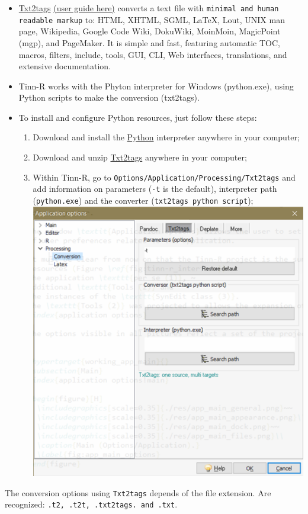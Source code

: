 \begin{itemize}
  \item \href{http://txt2tags.sourceforge.net}{Txt2tags}
    \href{http://txt2tags.sourceforge.net/userguide}{(user guide here)}
    converts a text file with \texttt{minimal and human readable markup} to:
    HTML, XHTML, SGML, \LaTeX, Lout, UNIX man page, Wikipedia, Google Code Wiki,
    DokuWiki, MoinMoin, MagicPoint (mgp), and PageMaker. It is simple and fast,
    featuring automatic TOC, macros, filters, include, tools, GUI, CLI,
    Web interfaces, translations, and extensive documentation.

  \item Tinn-R works with the Phyton interpreter for Windows (python.exe), using
    Python scripts to make the conversion (txt2tags).

  \item To install and configure Python resources, just follow these steps:
    \begin{enumerate}
      \item Download and install the
        \href{http://www.python.org/download/}{Python}
        interpreter anywhere in your computer;
      \item Download and unzip
        \href{http://txt2tags.sourceforge.net/}{Txt2tags}
        anywhere in your computer;
      \item Within Tinn-R, go to \texttt{Options/Application/Processing/Txt2tags}
        and add information on parameters (\texttt{-t} is the default),
        interpreter path (\texttt{python.exe}) and the
        converter (\texttt{txt2tags python script});\\

        \includegraphics[scale=1]{./res/app_processing_conversion_txt2tags.png}\\
    \end{enumerate}
\end{itemize}

The conversion options using \texttt{Txt2tags} depends of the file extension.
Are recognized: \texttt{.t2, .t2t, .txt2tags. and .txt}.

